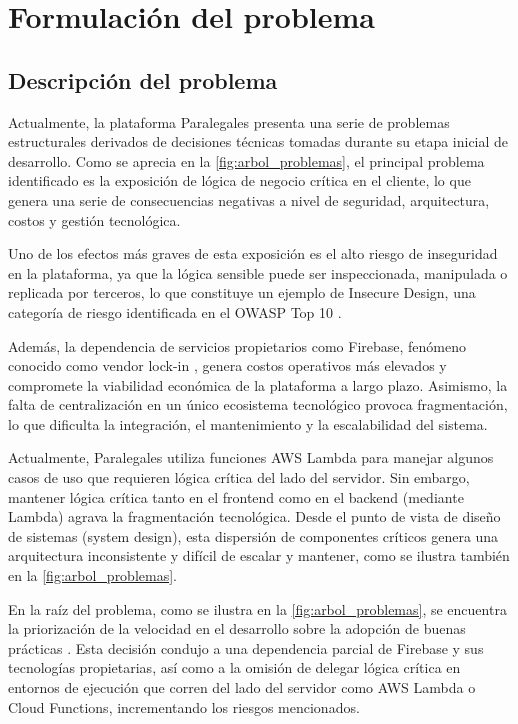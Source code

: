 \newpage
\section{Formulación del problema}

\subsection{Descripción del problema}
Actualmente, la plataforma Paralegales presenta una serie de problemas estructurales derivados de decisiones técnicas tomadas durante su etapa inicial de desarrollo. Como se aprecia en la \autoref{fig:arbol_problemas}, el principal problema identificado es la exposición de lógica de negocio crítica en el cliente, lo que genera una serie de consecuencias negativas a nivel de seguridad, arquitectura, costos y gestión tecnológica.

Uno de los efectos más graves de esta exposición es el alto riesgo de inseguridad en la plataforma, ya que la lógica sensible puede ser inspeccionada, manipulada o replicada por terceros, lo que constituye un ejemplo de Insecure Design, una categoría de riesgo identificada en el OWASP Top 10 \cite{OWASP2021}.

Además, la dependencia de servicios propietarios como Firebase, fenómeno conocido como vendor lock-in \cite{OparaMartins2016, OparaMartins2014,Harauzek2022}, genera costos operativos más elevados y compromete la viabilidad económica de la plataforma a largo plazo. Asimismo, la falta de centralización en un único ecosistema tecnológico provoca fragmentación, lo que dificulta la integración, el mantenimiento y la escalabilidad del sistema.

Actualmente, Paralegales utiliza funciones AWS Lambda para manejar algunos casos de uso que requieren lógica crítica del lado del servidor. Sin embargo, mantener lógica crítica tanto en el frontend como en el backend (mediante Lambda) agrava la fragmentación tecnológica. Desde el punto de vista de diseño de sistemas (system design), esta dispersión de componentes críticos genera una arquitectura inconsistente y difícil de escalar y mantener, como se ilustra también en la \autoref{fig:arbol_problemas}.

En la raíz del problema, como se ilustra en la \autoref{fig:arbol_problemas}, se encuentra la priorización de la velocidad en el desarrollo sobre la adopción de buenas prácticas \cite{BirrEngwall2024}. Esta decisión condujo a una dependencia parcial de Firebase y sus tecnologías propietarias, así como a la omisión de delegar lógica crítica en entornos de ejecución que corren del lado del servidor como AWS Lambda o Cloud Functions, incrementando los riesgos mencionados.

